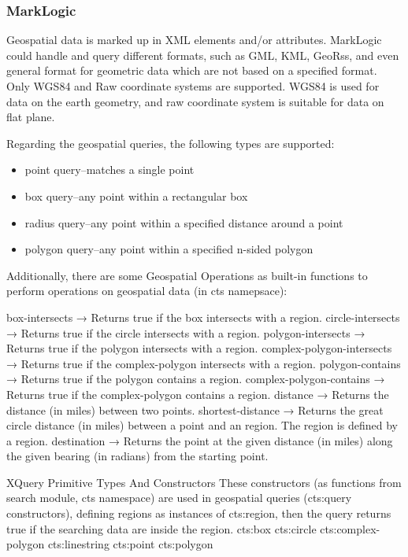 \subsubsection{MarkLogic}
Geospatial data is marked up in XML elements and/or attributes. MarkLogic could handle and query different formats, such as GML, KML, GeoRss, and even general format for geometric data which are not based on a specified format. Only WGS84 and Raw coordinate systems are supported. WGS84 is used for data on the earth geometry, and raw coordinate system is suitable for data on flat plane.

Regarding the geospatial queries, the following types are supported:
\begin{itemize}
\item point query--matches a single point
\item box query--any point within a rectangular box
\item radius query--any point within a specified distance around a point
\item polygon query--any point within a specified n-sided polygon
\end{itemize}

Additionally, there are some Geospatial Operations as built-in functions to perform operations on geospatial data (in cts namepsace):

 box-intersects → Returns true if the box intersects with a region.
 circle-intersects → Returns true if the circle intersects with a region.
 polygon-intersects → Returns true if the polygon intersects with a region.
 complex-polygon-intersects → Returns true if the complex-polygon intersects with a region.
 polygon-contains → Returns true if the polygon contains a region.
 complex-polygon-contains → Returns true if the complex-polygon contains a region.
 distance → Returns the distance (in miles) between two points.
 shortest-distance → Returns the great circle distance (in miles) between a point and an region. The region is defined by a region.
 destination → Returns the point at the given distance (in miles) along the given bearing (in radians) from the starting point.


 XQuery Primitive Types And Constructors
These constructors (as functions from search module, cts namespace) are used in geospatial queries (cts:query constructors), defining regions as instances of cts:region, then the query returns true if the searching data are inside the region.
 cts:box 
 cts:circle
 cts:complex-polygon
 cts:linestring
 cts:point
 cts:polygon

